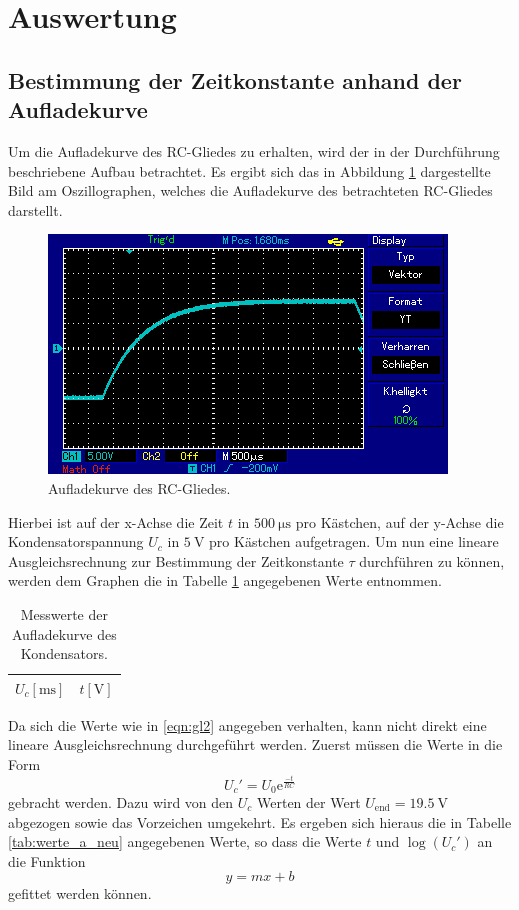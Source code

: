 \section{Auswertung}
\label{sec:Auswertung}
\subsection{Bestimmung der Zeitkonstante anhand der Aufladekurve}
Um die Aufladekurve des RC-Gliedes zu erhalten, wird der in der Durchführung beschriebene Aufbau betrachtet.
Es ergibt sich das in Abbildung \ref{fig:oz1} dargestellte Bild am Oszillographen, welches die Aufladekurve des betrachteten RC-Gliedes darstellt.

\begin{figure}[H]
  \centering
  \includegraphics{oz4.png}
  \caption{Aufladekurve des RC-Gliedes.}
  \label{fig:oz1}
\end{figure}

Hierbei ist auf der x-Achse die Zeit $t$ in $\SI{500}{\micro\second}$ pro Kästchen, auf der y-Achse die Kondensatorspannung $U_c$ in $\SI{5}{\volt}$ pro Kästchen aufgetragen.
Um nun eine lineare Ausgleichsrechnung zur Bestimmung der Zeitkonstante $\tau$ durchführen zu können, werden dem Graphen die in Tabelle \ref{tab:werte_a} angegebenen Werte entnommen.


\begin{table}[H]
  \centering
  \caption{Messwerte der Aufladekurve des Kondensators.}
  \label{tab:werte_a}
  \begin{tabular}{c c}
    \toprule
    {$U_c [\si{\milli\second}]$} & {$t [\si{\volt}]$}\\
    \midrule
    
    \bottomrule
  \end{tabular}
\end{table}

Da sich die Werte wie in \eqref{eqn:gl2} angegeben verhalten, kann nicht direkt eine lineare Ausgleichsrechnung durchgeführt werden.
Zuerst müssen die Werte in die Form
\begin{equation}
  U_c' = U_0 \mathrm{e}^{\frac{-t}{RC}}
\end{equation}
gebracht werden.
Dazu wird von den $U_c$ Werten der Wert $U_{\text{end}} = \SI{19.5}{\volt}$ abgezogen sowie das Vorzeichen umgekehrt.
Es ergeben sich hieraus die in Tabelle \ref{tab:werte_a_neu} angegebenen Werte, so dass die Werte $t$ und $\log(U_c')$ an die Funktion
\begin{equation}
  y = m x +b
\end{equation}
gefittet werden können.

